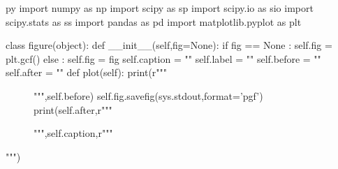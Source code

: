 \usepackage[headheight=14pt, top=0.5cm, bottom=0.5cm, left=.5cm, right=.5cm]{geometry}

\usepackage{fontspec}

\usepackage{polyglossia}
\setdefaultlanguage{english}
\usepackage{amsmath, amssymb}
\usepackage{graphicx}
\usepackage{pgf}
\usepackage{import}

\usepackage[outputdir=build]{minted}
\usepackage{minted}


\usepackage{pythontex}
\begin{pythontexcustomcode}{py}
import numpy as np
import scipy as sp
import scipy.io as sio
import scipy.stats as ss
import pandas as pd
import matplotlib.pyplot as plt

class figure(object):
	def __init__(self,fig=None):
		if fig == None :
			self.fig = plt.gcf()
		else :
			self.fig = fig
		self.caption = ""
		self.label = ""
		self.before = ""
		self.after = ""
	def plot(self):
		print(r"""
		\begin{figure}[ht]
			\centering
			""",self.before)
		self.fig.savefig(sys.stdout,format='pgf')
		print(self.after,r"""
			\caption{""",self.caption,r"""}%
			\label{fig:""",self.label,r"""}
		\end{figure}
		""")


\end{pythontexcustomcode}



\setlength\parindent{0pt}
